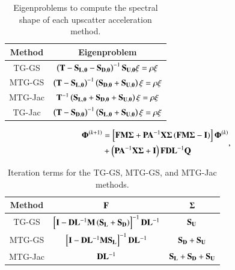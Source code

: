 \documentclass[preprint,10pt]{elsarticle}
\begin{document}
\begin{table}
\centering
\caption{Eigenproblems to compute the spectral shape of each upscatter acceleration method.}
\def\arraystretch{1.5}
\begin{tabular}{|c|c|} \hline
Method &  Eigenproblem \\ \hline \hline
TG-GS & $\left(  {\bf T} - {\bf S_{L,0}} - {\bf S_{D,0}} \right)^{-1} {\bf S_{U,0}} \xi = \rho \xi$ \\ \hline
MTG-GS & $\left(  {\bf T} - {\bf S_{L,0}}  \right)^{-1} \left( {\bf S_{D,0}}+ {\bf S_{U,0}} \right)\xi = \rho \xi $ \\ \hline
MTG-Jac &${\bf T}^{-1} \left( {\bf S_{L,0}}+{\bf S_{D,0}} +  {\bf S_{U,0}} \right)\xi = \rho \xi$   \\ \hline
TG-Jac & $\left(  {\bf T} - {\bf S_{D,0}} \right)^{-1} \left( {\bf S_{L,0}} +  {\bf S_{U,0}} \right)\xi = \rho \xi$ \\ \hline
\end{tabular}
\label{tab::DSA_MG_Summary_eprobs}
\end{table}

\begin{equation}
\label{eq::DSA_MG_Summary_form}
\begin{aligned}
{\bf \Phi}^{(k+1)} &= \left[ {\bf F} {\bf M} {\bf \Sigma} + {\bf P} {\bf A}^{-1}  {\bf X} {\bf \Sigma} \left(  {\bf F} {\bf M} {\bf \Sigma} - {\bf I} \right)  \right]   {\bf \Phi}^{(k)} \\
&+ \left(  {\bf P} {\bf A}^{-1}  {\bf X} {\bf \Sigma}  + {\bf I} \right) {\bf F} {\bf D}{\bf L}^{-1}  {\bf Q}
\end{aligned} ,
\end{equation}

\begin{table}
\centering
\caption{Iteration terms for the TG-GS, MTG-GS, and MTG-Jac methods.}
\def\arraystretch{1.5}
\begin{tabular}{|c||c|c|} \hline
Method & ${\bf F}$ & ${\bf \Sigma}$ \\ \hline \hline
TG-GS & $\left[ {\bf I} - {\bf D}{\bf L}^{-1} {\bf M} \left(  {\bf S_L} + {\bf S_D} \right) \right]^{-1} {\bf D}{\bf L}^{-1}$ & ${\bf S_{U}}$ \\ \hline
MTG-GS & $\left[ {\bf I} - {\bf D}{\bf L}^{-1} {\bf M}{\bf S_L}\right]^{-1} {\bf D}{\bf L}^{-1}$ & ${\bf S_{D}} + {\bf S_{U}}$ \\ \hline
MTG-Jac & ${\bf D}{\bf L}^{-1}$ & ${\bf S_{L}} + {\bf S_{D}} + {\bf S_{U}}$ \\ \hline
\end{tabular}
\label{tab::DSA_MG_Summary_diffterms}
\end{table}
\end{document}
